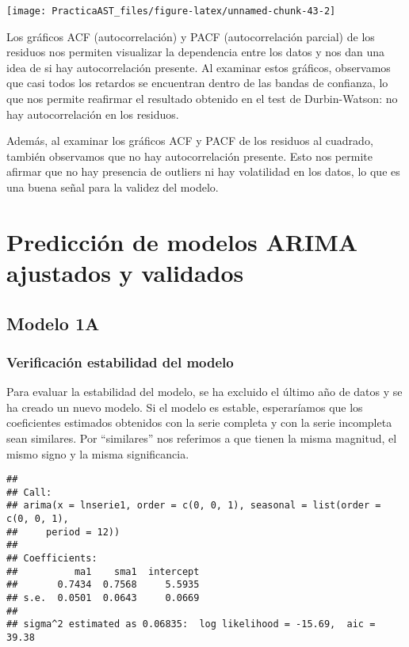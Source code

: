 \documentclass[
]{article}
\begin{document}
\begin{center}\texttt{[image: PracticaAST\_files/figure-latex/unnamed-chunk-43-2]} \end{center}

Los gráficos ACF (autocorrelación) y PACF (autocorrelación parcial) de
los residuos nos permiten visualizar la dependencia entre los datos y
nos dan una idea de si hay autocorrelación presente. Al examinar estos
gráficos, observamos que casi todos los retardos se encuentran dentro de
las bandas de confianza, lo que nos permite reafirmar el resultado
obtenido en el test de Durbin-Watson: no hay autocorrelación en los
residuos.

Además, al examinar los gráficos ACF y PACF de los residuos al cuadrado,
también observamos que no hay autocorrelación presente. Esto nos permite
afirmar que no hay presencia de outliers ni hay volatilidad en los
datos, lo que es una buena señal para la validez del modelo.

\hypertarget{predicciuxf3n-de-modelos-arima-ajustados-y-validados}{%
\section{Predicción de modelos ARIMA ajustados y
validados}\label{predicciuxf3n-de-modelos-arima-ajustados-y-validados}}

\hypertarget{modelo-1a}{%
\subsection{Modelo 1A}\label{modelo-1a}}

\hypertarget{verificaciuxf3n-estabilidad-del-modelo}{%
\subsubsection{Verificación estabilidad del
modelo}\label{verificaciuxf3n-estabilidad-del-modelo}}

Para evaluar la estabilidad del modelo, se ha excluido el último año de
datos y se ha creado un nuevo modelo. Si el modelo es estable,
esperaríamos que los coeficientes estimados obtenidos con la serie
completa y con la serie incompleta sean similares. Por ``similares'' nos
referimos a que tienen la misma magnitud, el mismo signo y la misma
significancia.

\begin{verbatim}
## 
## Call:
## arima(x = lnserie1, order = c(0, 0, 1), seasonal = list(order = c(0, 0, 1), 
##     period = 12))
## 
## Coefficients:
##          ma1    sma1  intercept
##       0.7434  0.7568     5.5935
## s.e.  0.0501  0.0643     0.0669
## 
## sigma^2 estimated as 0.06835:  log likelihood = -15.69,  aic = 39.38
\end{verbatim}
\end{document}
